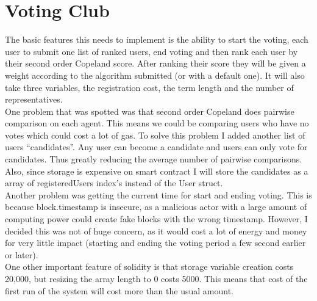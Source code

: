 \section{Voting Club}
The basic features this needs to implement is the ability to start the voting, each user to submit one list of ranked users, end voting and then rank each user by their second order Copeland score. After ranking their score they will be given a weight according to the algorithm submitted (or with a default one). It will also take three variables, the registration cost, the term length and the number of representatives. \\
One problem that was spotted was that second order Copeland does pairwise comparison on each agent. This means we could be comparing users who have no votes which could cost a lot of gas. To solve this problem I added another list of users “candidates”. Any user can become a candidate and users can only vote for candidates. Thus greatly reducing the average number of pairwise comparisons. Also, since storage is expensive on smart contract I will store the candidates as a array of registeredUsers index’s instead of the User struct.\\
Another problem was getting the current time for start and ending voting. This is because block.timestamp is insecure, as a malicious actor with a large amount of computing power could create fake blocks with the wrong timestamp. However, I decided this was not of huge concern, as it would cost a lot of energy and money for very little impact (starting and ending the voting period a few second earlier or later). \\
One other important feature of solidity is that storage variable creation costs 20,000, but resizing the array length to 0 costs 5000. This means that cost of the first run of the system will cost more than the usual amount. 
